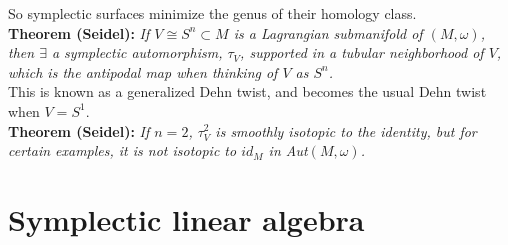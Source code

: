 \documentclass[12pt]{report}
\theoremstyle{definition}
\theoremstyle{remark}
\numberwithin{equation}{section}
\theoremstyle{definition}
\begin{document}
So symplectic surfaces minimize the genus of their homology class. \\\textbf{Theorem (Seidel): }\textit{If $V\cong S^n \subset M$ is a Lagrangian submanifold of $(M,\omega)$, then $\exists$ a symplectic automorphism, $\tau_V$, supported in a tubular neighborhood of $V$, which is the antipodal map when thinking of $V$ as $S^n$.} \\
This is known as a generalized Dehn twist, and becomes the usual Dehn twist when $V = S^1$. \\
\textbf{Theorem (Seidel): }\textit{If $n = 2$, $\tau_V^2$ is smoothly isotopic to the identity, but for certain examples, it is not isotopic to $id_M$ in Aut$(M,\omega)$.}
\chapter{Symplectic linear algebra}
\end{document}
